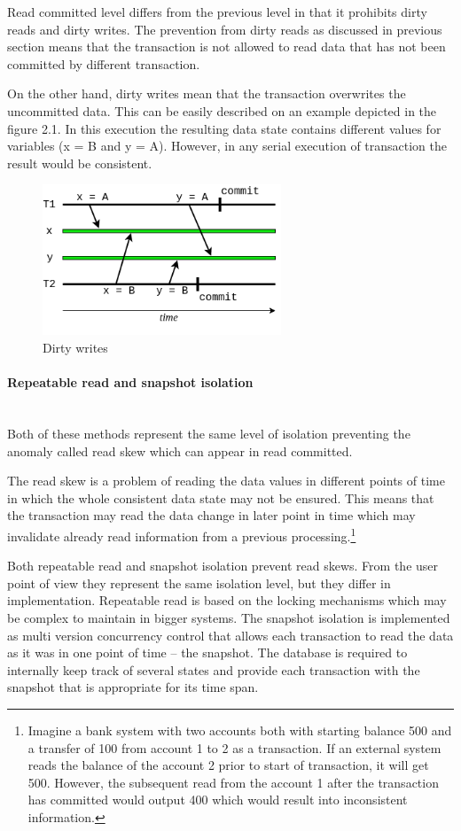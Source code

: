 \documentclass[oneside,
  digital, %
  table,   %
  nolof,     %
  nolot,     %
]{fithesis3}
\newcommand{\newlinepar}[1]{\paragraph{#1}\needspace{4\baselineskip}\mbox{}\\}
\begin{document}
Read committed level differs from the previous level in that it prohibits dirty reads and dirty writes. The prevention from dirty reads as discussed in previous section means that the transaction is not allowed to read data that has not been committed by different transaction. 

On the other hand, dirty writes mean that the transaction overwrites the uncommitted data. This can be easily described on an example depicted in the figure 2.1. In this execution the resulting data state contains different values for variables (x = B and y = A). However, in any serial execution of transaction the result would be consistent.

\begin{figure}
    \begin{center}
        \includegraphics[height=45mm]{images/dirtyWrite.png}
    \end{center}
    \caption{Dirty writes}
\end{figure}

\newlinepar{Repeatable read and snapshot isolation}

Both of these methods represent the same level of isolation preventing the anomaly called read skew which can appear in read committed.

The read skew is a problem of reading the data values in different points of time in which the whole consistent data state may not be ensured. This means that the transaction may read the data change in later point in time which may invalidate already read information from a previous processing.\footnote{Imagine a bank system with two accounts both with starting balance 500 and a transfer of 100 from account 1 to 2 as a transaction. If an external system reads the balance of the account 2 prior to start of transaction, it will get 500. However, the subsequent read from the account 1 after the transaction has committed would output 400 which would result into inconsistent information.}

Both repeatable read and snapshot isolation prevent read skews. From the user point of view they represent the same isolation level, but they differ in implementation. Repeatable read is based on the locking mechanisms which may be complex to maintain in bigger systems. The snapshot isolation is implemented as multi version concurrency control that allows each transaction to read the data as it was in one point of time -- the snapshot. The database is required to internally keep track of several states and provide each transaction with the snapshot that is appropriate for its time span.
\end{document}
